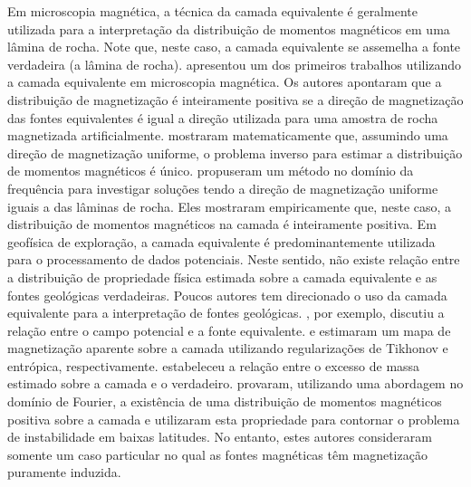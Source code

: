 Em microscopia magnética, a técnica da camada equivalente é geralmente utilizada para a interpretação da distribuição de momentos magnéticos em uma lâmina de rocha. Note que, neste caso, a camada equivalente se assemelha a fonte verdadeira (a lâmina de rocha). \cite{weiss2007} apresentou um dos primeiros trabalhos utilizando a camada equivalente em microscopia magnética. Os autores apontaram que a distribuição de magnetização 
é inteiramente positiva se a direção de magnetização das fontes equivalentes é igual a direção utilizada para uma amostra de rocha magnetizada artificialmente. \cite{baratchart2013} mostraram matematicamente que, assumindo uma direção de magnetização uniforme, o problema inverso para estimar a distribuição de momentos 
magnéticos é único. \cite{lima2013} propuseram um método no domínio da frequência para investigar soluções tendo a direção de magnetização uniforme iguais a das lâminas de rocha. Eles mostraram empiricamente que, neste caso, a distribuição de momentos magnéticos na camada é inteiramente positiva.  Em geofísica de exploração, a 
camada equivalente é predominantemente utilizada para o processamento de dados potenciais. Neste sentido, não existe relação entre a distribuição de propriedade física estimada sobre a camada equivalente e as fontes geológicas verdadeiras. Poucos autores tem direcionado o uso da camada equivalente para a interpretação de fontes 
geológicas. \cite{pedersen1991}, por exemplo, discutiu a relação entre o campo potencial e a fonte equivalente. \cite{medeiros_silva1996} e \cite{silva-etal2010} estimaram um mapa de magnetização aparente sobre a camada utilizando regularizações de Tikhonov e entrópica, respectivamente. \cite{siqueira_etal_2017} estabeleceu a 
relação entre o excesso de massa estimado sobre a camada e o verdadeiro. \cite{li_etal_2014} provaram, utilizando uma abordagem no domínio de Fourier, a existência de uma distribuição de momentos magnéticos positiva sobre a camada e utilizaram esta propriedade para contornar o problema de instabilidade em baixas latitudes. No entanto, estes autores consideraram somente um caso particular no qual as fontes magnéticas têm magnetização puramente induzida. 

